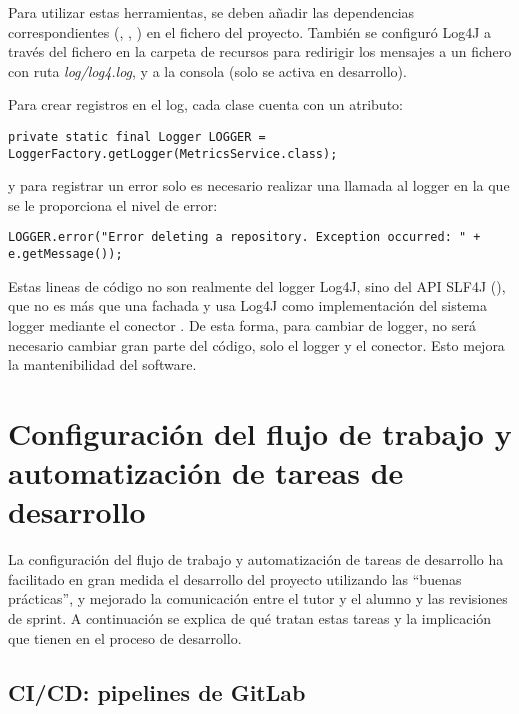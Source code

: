 Para utilizar estas herramientas, se deben añadir las dependencias correspondientes (, , ) en el fichero  del proyecto. También se configuró Log4J a través del fichero  en la carpeta de recursos  para redirigir los mensajes a un fichero con ruta \textit{log/log4.log}, y a la consola (solo se activa en desarrollo).

Para crear registros en el log, cada clase cuenta con un atributo:\\
\begin{minipage}{\linewidth}
{\tiny
\begin{lstlisting}[breaklines]
private static final Logger LOGGER = LoggerFactory.getLogger(MetricsService.class);
\end{lstlisting}
}
\end{minipage}
y para registrar un error solo es necesario realizar una llamada al logger en la que se le proporciona el nivel de error:\\
\begin{minipage}{\linewidth}
{\tiny
\begin{lstlisting}[breaklines]
LOGGER.error("Error deleting a repository. Exception occurred: " + e.getMessage());
\end{lstlisting}
}
\end{minipage}

Estas lineas de código no son realmente del logger Log4J, sino del API SLF4J (), que no es más que una fachada y usa Log4J como implementación del sistema logger mediante el conector . De esta forma, para cambiar de logger, no será necesario cambiar gran parte del código, solo el logger y el conector. Esto mejora la mantenibilidad del software.

\section{Configuración del flujo de trabajo y automatización de tareas de desarrollo}

La configuración del flujo de trabajo y automatización de tareas de desarrollo ha facilitado en gran medida el desarrollo del proyecto utilizando las ``buenas prácticas'', y mejorado la comunicación entre el tutor y el alumno y las revisiones de sprint. A continuación se explica de qué tratan estas tareas y la implicación que tienen en el proceso de desarrollo.

\subsection{CI/CD: pipelines de GitLab}\label{sect:5_4_1_CICD}

